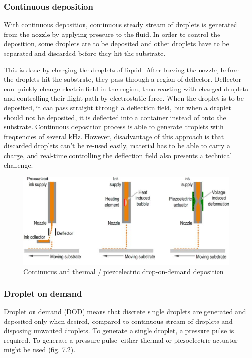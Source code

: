 \documentclass[a4paper, twoside, 11pt]{report}
\begin{document}
\subsubsection{Continuous deposition}
With continuous deposition, continuous steady stream of droplets is generated from the nozzle by applying pressure to the fluid. In order to control the deposition, some droplets are to be deposited and other droplets have to be separated and discarded before they hit the substrate.

	This is done by charging the droplets of liquid. After leaving the nozzle, before the droplets hit the substrate, they pass through a region of deflector. Deflector can quickly change electric field in the region, thus reacting with charged droplets and controlling their flight-path by electrostatic force. When the droplet is to be deposited, it can pass straight through a deflection field, but when a droplet should not be deposited, it is deflected into a container instead of onto the substrate. Continuous deposition process is able to generate droplets with frequencies of several kHz. However, disadvantage of this approach is that discarded droplets can't be re-used easily, material has to be able to carry a charge, and real-time controlling the deflection field also presents a technical challenge.

\begin{figure}[h!]
	\centering
	\includegraphics[scale=1]{ContinuousDOD}
	\caption{Continuous and thermal / piezoelectric drop-on-demand deposition \cite{InkjetPrinting}}
\end{figure}

\subsubsection{Droplet on demand}
Droplet on demand (DOD) means that discrete single droplets are generated and deposited only when desired, compared to continuous stream of droplets and disposing unwanted droplets. To generate a single droplet, a pressure pulse is required. To generate a pressure pulse, either thermal or piezoelectric actuator might be used (fig. 7.2).
\end{document}
